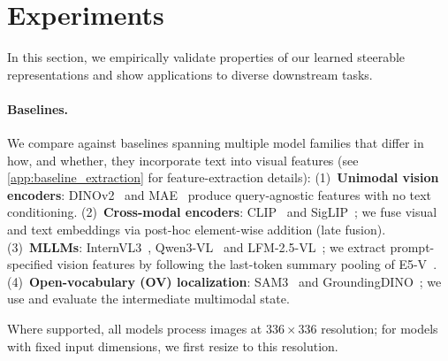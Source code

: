 \section{Experiments}
\label{sec:experiments}

In this section, we empirically validate properties of our learned steerable representations and show applications to diverse downstream tasks.%


\paragraph{Baselines.}
\label{subsec:baselines}


We compare \model{} against baselines spanning multiple model families that differ in how, and whether, they incorporate text into visual features (see \cref{app:baseline_extraction} for feature-extraction details):
(1)~\textbf{Unimodal vision encoders}: DINOv2~\cite{dinov2} and MAE~\cite{he2022mae} produce query-agnostic features with no text conditioning.
(2)~\textbf{Cross-modal encoders}: CLIP~\cite{radford2021_clip} and SigLIP~\cite{zhai2023_siglip}; we fuse visual and text embeddings via post-hoc element-wise addition (late fusion).
(3)~\textbf{MLLMs}: InternVL3~\cite{zhu2025internvl3}, Qwen3-VL~\cite{Qwen3-VL} and LFM-2.5-VL~\cite{amini2025lfm2technicalreport}; we extract prompt-specified vision features by following the last-token summary pooling of E5-V~\cite{Jiang2024E5VUE}.
(4)~\textbf{Open-vocabulary (OV) localization}: SAM3~\cite{carion2025_sam3} and GroundingDINO~\cite{liu2023groundingdino}; we use and evaluate the intermediate multimodal state.


Where supported, all models process images at $336\times336$ resolution; for models with fixed input dimensions, we first resize to this resolution.




